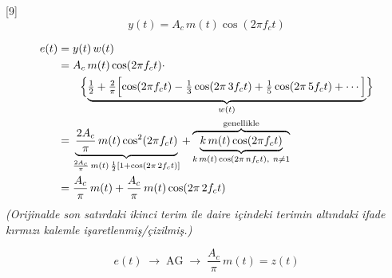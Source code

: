 \documentclass[11pt,a4paper]{article}
\begin{document}
\begin{ornek}
[9]
\[ y(t) = A_c\, m(t)\cos(2\pi f_c t) \]
\end{ornek}

\begin{align*}
e(t) &= y(t)\,w(t)\\
&= A_c\, m(t)\cos(2\pi f_c t)\cdot\\
&\qquad\Bigl\{\underbrace{\tfrac12 + \tfrac2\pi\Bigl[\cos(2\pi f_c t) - \tfrac13\cos(2\pi\, 3f_c t) + \tfrac15\cos(2\pi\, 5f_c t) + \cdots\Bigr]}_{w(t)}\Bigr\}\\
&= \underbrace{\frac{2A_c}{\pi}\, m(t)\cos^2(2\pi f_c t)}_{\frac{2A_c}{\pi}\, m(t)\,\frac12\left[1+\cos(2\pi\, 2f_c t)\right]} + \overbrace{\underbrace{k\, m(t)\cos(2\pi f_c t)}_{k\, m(t)\cos(2\pi\, n f_c t),\ n\neq 1}}^{\text{genellikle}}\\
&= \frac{A_c}{\pi}\, m(t) + \frac{A_c}{\pi}\, m(t)\cos(2\pi\, 2f_c t)
\end{align*}
\textit{(Orijinalde son satırdaki ikinci terim ile daire içindeki terimin altındaki ifade kırmızı kalemle işaretlenmiş/çizilmiş.)}

\[ e(t)\;\rightarrow\;\boxed{\mathrm{AG}}\;\rightarrow\;\frac{A_c}{\pi}\, m(t) = z(t) \]
\end{document}
